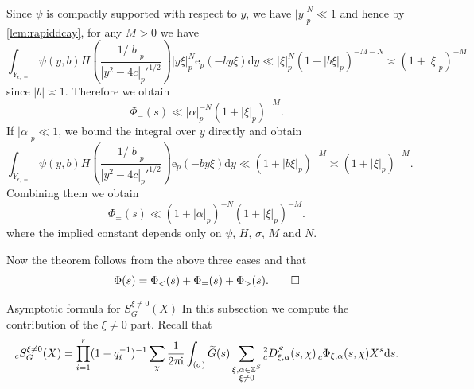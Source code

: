 \documentclass[10pt,oneside,reqno]{amsart}
\makeatletter
\newcommand\rmd{\mathrm{d}}
\newcommand\rme{\mathrm{e}}
\newcommand\rmi{\mathrm{i}}
\newcommand\ZZ{\mathbb{Z}}
\newcommand\dpii{2\uppi\rmi}
\newcommand\legendresymbol[2]{\genfrac{(}{)}{}{}{#1}{#2}}
\def\subsection{\@startsection{subsection}{2}%
  \z@{3pt\@plus0pt}{-.5em}%
  {\normalfont\bfseries}}
\theoremstyle{THEOREM}
\theoremstyle{DEFINITION}
\theoremstyle{EXERCISE}
\numberwithin{equation}{section}
\renewenvironment{proof}[1][\proofname]{\par
  \vspace{-6pt}
  \pushQED{\qed}
  \normalfont \topsep6\p@\@plus6\p@\relax
  \trivlist
  \item[\hskip\labelsep\rmfamily\bfseries
    #1\@addpunct{:}]\ignorespaces
}{
  \popQED\endtrivlist\@endpefalse
  \vspace{-6pt}
}
\makeatother
\begin{document}
\begin{proof}[Proof of \autoref{thm:nonarchimedeanintegralestimate}]
Since $\psi$ is compactly supported with respect to $y$, we have $|y|_p^N\ll 1$ and hence by \autoref{lem:rapiddcay}, for any $M>0$ we have
\[
\int_{Y_{\epsilon,=}}\psi(y,b)H\legendresymbol {1/|b|_p}{|y^2-4c|_p'^{1/2}}|y\xi|_p^N\rme_p(-by\xi)\rmd y\ll |\xi|_p^N(1+|b\xi|_p)^{-M-N}\asymp (1+|\xi|_p)^{-M}
\]
since $|b|\asymp 1$. Therefore we obtain
\[
\Phi_=(s)\ll |\alpha|_p^{-N}(1+|\xi|_p)^{-M}.
\]
If $|\alpha|_p\ll 1$, we bound the integral over $y$ directly and obtain
\[
\int_{Y_{\epsilon,=}}\psi(y,b)H\legendresymbol {1/|b|_p}{|y^2-4c|_p'^{1/2}}\rme_p(-by\xi)\rmd y\ll (1+|b\xi|_p)^{-M}\asymp (1+|\xi|_p)^{-M}.
\]
Combining them we obtain 
\[
\Phi_=(s)\ll (1+|\alpha|_p)^{-N}(1+|\xi|_p)^{-M}.
\]
where the implied constant depends only on $\psi$, $H$, $\sigma$, $M$ and $N$.

Now the theorem follows from the above three cases and that
\[
\Phi(s)=\Phi_<(s)+\Phi_=(s)+\Phi_>(s).\qedhere
\]
\end{proof}

\subsection{Asymptotic formula for $S_G^{\xi\neq 0}(X)$}
In this subsection we compute the contribution of the $\xi\neq 0$ part. Recall that
\[
_cS_G^{\xi\neq 0}(X)=\prod_{i=1}^{r}(1-q_i^{-1})^{-1}\sum_{\chi}\frac{1}{\dpii}\int_{(\sigma)}\widetilde{G}(s) \sum_{\substack{\xi,\alpha\in \ZZ^S\\ \xi\neq 0}}{}^2_c D_{\xi,\alpha}^S(s,\chi){}\prescript{}{c}\Phi_{\xi,\alpha}(s,\chi)X^s\rmd s.
\]
\end{document}
